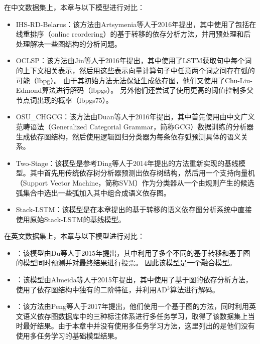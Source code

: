 在中文数据集上，本章与以下模型进行对比：
\begin{itemize}
    \item IHS-RD-Belarus\cite{artsymenia-etal-2016-ihs}：该方法由Artsymenia等人于2016年提出，其中使用了包括在线重排序（online reordering）的基于转移的依存分析方法，并用预处理和后处理解决一些图结构的分析问题。
    \item OCLSP\cite{jin-etal-2016-oclsp}：该方法由Jin等人于2016年提出，其中使用了LSTM获取句中每个词的上下文相关表示，然后用这些表示向量计算句子中任意两个词之间存在弧的可能（lbpg）。
    由于其初始方法无法保证生成依存图，他们又使用了Chu-Liu-Edmond算法\cite{chu-liu-1965-shortest}进行解码（lbpgs）。
    另外他们还尝试了使用更高的阈值控制多父节点词出现的概率（lbpgs75）。
    
    \item OSU\_CHGCG\cite{duan-etal-2016-osu}：该方法由Duan等人于2016年提出，其中首先使用由中文广义范畴语法（Generalized Categorial Grammar，简称GCG）数据训练的分析器生成依存图结构，然后使用逻辑回归分类器为每条依存弧预测具体的语义关系。
    \item Two-Stage：该模型是参考Ding等人\cite{ding-etal-2014-dependency}于2014年提出的方法重新实现的基线模型。其中首先用传统依存树分析器预测出依存树结构，然后用一个支持向量机（Support Vector Machine，简称SVM）作为分类器从一个由规则产生的候选弧集合中选出一些弧加入其中组合成语义依存图。
    \item Stack-LSTM：该模型是在本章提出的基于转移的语义依存图分析系统中直接使用原始Stack-LSTM的基线模型。
\end{itemize}

在英文数据集上，本章与以下模型进行对比：
\begin{itemize}
    \item \citet{du-etal-2015-peking} ：该模型由Du等人于2015年提出，其中利用了多个不同的基于转移和基于图的模型同时预测并对最终结果进行投票。
    因此该模型是一个融合模型。
    \item \citet{almeida-martins-2015-lisbon}：该模型由Almeida等人于2015年提出，其中使用了基于图的依存分析方法，使用了依存图结构中独有的二阶特征，并利用AD$^3$算法\cite{martins-etal-2011-dual}进行解码。
    \item \citet{peng-etal-2017-deep}：该方法由Peng等人于2017年提出，他们使用一个基于图的方法，同时利用英文语义依存图数据库中的三种标注体系进行多任务学习，取得了该数据集上当时最好结果。由于本章中并没有使用多任务学习方法，这里列出的是他们没有使用多任务学习的基础模型结果。
\end{itemize}


